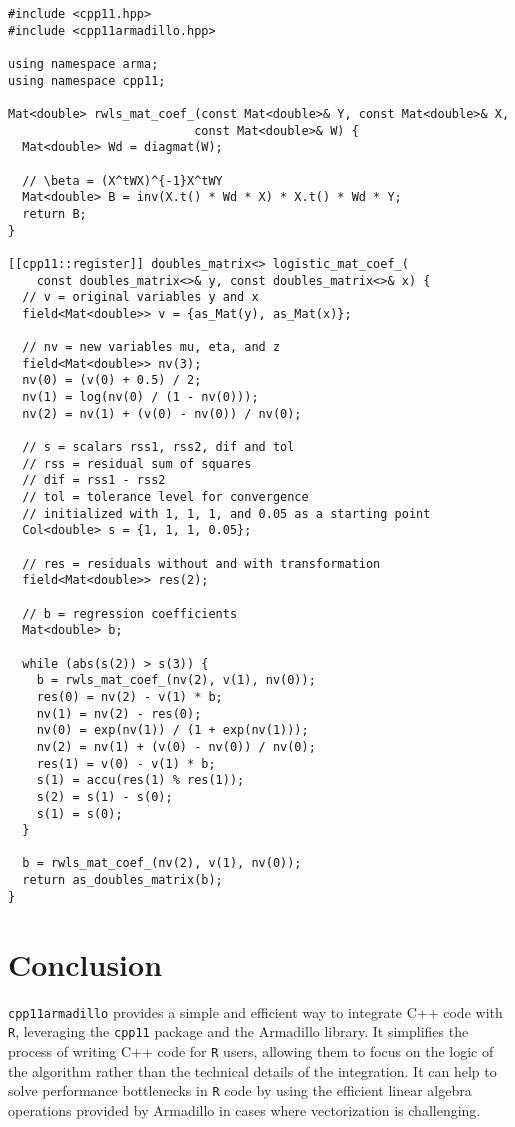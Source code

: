 \begin{verbatim}
#include <cpp11.hpp>
#include <cpp11armadillo.hpp>

using namespace arma;
using namespace cpp11;

Mat<double> rwls_mat_coef_(const Mat<double>& Y, const Mat<double>& X,
                          const Mat<double>& W) {
  Mat<double> Wd = diagmat(W);

  // \beta = (X^tWX)^{-1}X^tWY
  Mat<double> B = inv(X.t() * Wd * X) * X.t() * Wd * Y;
  return B;
}

[[cpp11::register]] doubles_matrix<> logistic_mat_coef_(
    const doubles_matrix<>& y, const doubles_matrix<>& x) {
  // v = original variables y and x
  field<Mat<double>> v = {as_Mat(y), as_Mat(x)};

  // nv = new variables mu, eta, and z
  field<Mat<double>> nv(3);
  nv(0) = (v(0) + 0.5) / 2;
  nv(1) = log(nv(0) / (1 - nv(0)));
  nv(2) = nv(1) + (v(0) - nv(0)) / nv(0);

  // s = scalars rss1, rss2, dif and tol
  // rss = residual sum of squares
  // dif = rss1 - rss2
  // tol = tolerance level for convergence
  // initialized with 1, 1, 1, and 0.05 as a starting point
  Col<double> s = {1, 1, 1, 0.05};

  // res = residuals without and with transformation
  field<Mat<double>> res(2);

  // b = regression coefficients
  Mat<double> b;

  while (abs(s(2)) > s(3)) {
    b = rwls_mat_coef_(nv(2), v(1), nv(0));
    res(0) = nv(2) - v(1) * b;
    nv(1) = nv(2) - res(0);
    nv(0) = exp(nv(1)) / (1 + exp(nv(1)));
    nv(2) = nv(1) + (v(0) - nv(0)) / nv(0);
    res(1) = v(0) - v(1) * b;
    s(1) = accu(res(1) % res(1));
    s(2) = s(1) - s(0);
    s(1) = s(0);
  }

  b = rwls_mat_coef_(nv(2), v(1), nv(0));
  return as_doubles_matrix(b);
}
\end{verbatim}

\hypertarget{conclusion}{%
\section{Conclusion}\label{conclusion}}

\texttt{cpp11armadillo} provides a simple and efficient way to integrate C++ code with
\texttt{R}, leveraging the \texttt{cpp11} package and the Armadillo library. It simplifies
the process of writing C++ code for \texttt{R} users, allowing them to focus on the
logic of the algorithm rather than the technical details of the integration. It
can help to solve performance bottlenecks in \texttt{R} code by using the efficient
linear algebra operations provided by Armadillo in cases where vectorization
is challenging.

